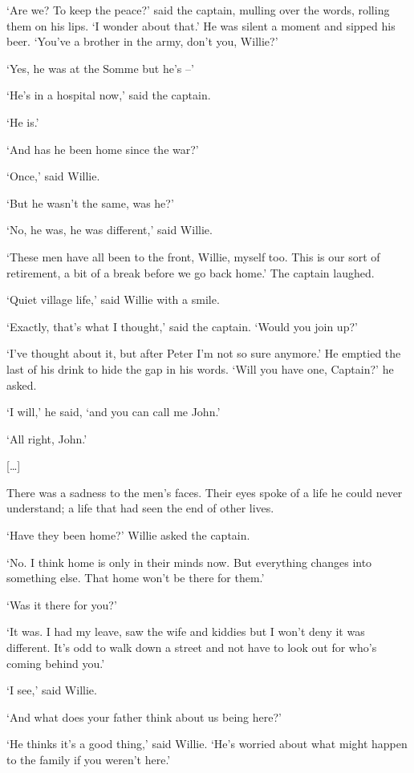 \documentclass[10pt,a4paper]{article}
\begin{document}
‘Are we? To keep the peace?’ said the captain, mulling over the words, rolling them on his lips. ‘I wonder about that.’ He was silent a moment and sipped his beer. ‘You’ve a brother in the army, don’t you, Willie?’

‘Yes, he was at the Somme but he’s –’

‘He’s in a hospital now,’ said the captain.

‘He is.’

‘And has he been home since the war?’

‘Once,’ said Willie.

‘But he wasn’t the same, was he?’

‘No, he was, he was different,’ said Willie.

‘These men have all been to the front, Willie, myself too. This is our sort of retirement, a bit of a break before we go back home.’ The captain laughed.

‘Quiet village life,’ said Willie with a smile.

‘Exactly, that’s what I thought,’ said the captain. ‘Would you join up?’

‘I’ve thought about it, but after Peter I’m not so sure anymore.’ He emptied the last of his drink to hide the gap in his words. ‘Will you have one, Captain?’ he asked.

‘I will,’ he said, ‘and you can call me John.’

‘All right, John.’

[…]

There was a sadness to the men’s faces. Their eyes spoke of a life he could never understand; a life that had seen the end of other lives.

‘Have they been home?’ Willie asked the captain.

‘No. I think home is only in their minds now. But everything changes into something else. That home won’t be there for them.’

‘Was it there for you?’

‘It was. I had my leave, saw the wife and kiddies but I won’t deny it was different. It’s odd to walk down a street and not have to look out for who’s coming behind you.’

‘I see,’ said Willie.

‘And what does your father think about us being here?’

‘He thinks it’s a good thing,’ said Willie. ‘He’s worried about what might happen to the family if you weren’t here.’
\end{document}
